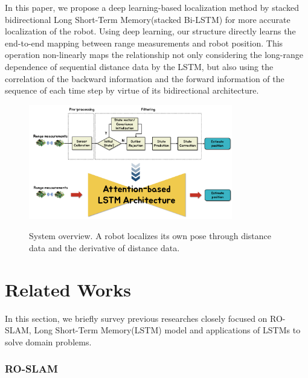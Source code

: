 \documentclass[letterpaper, 10 pt, conference]{ieeeconf}  %
\begin{document}
 In this paper, we propose a deep learning-based localization method by stacked bidirectional Long Short-Term Memory(stacked Bi-LSTM) for more accurate localization of the robot. Using deep learning, our structure directly learns the end-to-end mapping between range measurements and robot position. This operation non-linearly maps the relationship not only considering the long-range dependence of sequential distance data by the LSTM, but also using the correlation of the backward information and the forward information of the sequence of each time step by virtue of its bidirectional architecture.
 
\begin{figure}[h]
	
	\centering
	\includegraphics[height=5cm]{CE554_traditional_to_RNN}
	\label{fig:example}
	\caption{System overview. A robot localizes its own pose through distance data and the derivative of distance data. }
	
\end{figure}

\section{Related Works}

In this section, we briefly survey previous researches closely focused on 
RO-SLAM, Long Short-Term Memory(LSTM) model and applications of LSTMs to solve domain problems.

\subsubsection{RO-SLAM}
\end{document}
